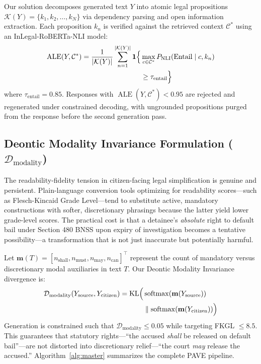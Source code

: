 \documentclass[conference]{IEEEtran}
\begin{document}
Our solution decomposes generated text $Y$ into atomic legal propositions $\mathcal{K}(Y) = \{k_1, k_2, \dots, k_N\}$ via dependency parsing and open information extraction. Each proposition $k_n$ is verified against the retrieved context $\mathcal{C}^*$ using an InLegal-RoBERTa-NLI model:
\begin{equation}
\begin{aligned}
\operatorname{ALE}(Y, \mathcal{C}^*) = \frac{1}{|\mathcal{K}(Y)|} \sum_{n=1}^{|\mathcal{K}(Y)|} \mathbf{1}\Bigl\{ &\max_{c \in \mathcal{C}^*} P_{\text{NLI}}(\text{Entail} \mid c, k_n) \\
&\ge \tau_{\text{entail}} \Bigr\}
\end{aligned}
\end{equation}
where $\tau_{\text{entail}} = 0.85$. Responses with $\operatorname{ALE}(Y, \mathcal{C}^*) < 0.95$ are rejected and regenerated under constrained decoding, with ungrounded propositions purged from the response before the second generation pass.

\subsection{Deontic Modality Invariance Formulation ($\mathcal{D}_{\text{modality}}$)}
The readability-fidelity tension in citizen-facing legal simplification is genuine and persistent. Plain-language conversion tools optimizing for readability scores---such as Flesch-Kincaid Grade Level---tend to substitute active, mandatory constructions with softer, discretionary phrasings because the latter yield lower grade-level scores. The practical cost is that a detainee's \textit{absolute} right to default bail under Section 480 BNSS upon expiry of investigation becomes a tentative possibility---a transformation that is not just inaccurate but potentially harmful.

Let $\mathbf{m}(T) = [n_{\text{shall}}, n_{\text{must}}, n_{\text{may}}, n_{\text{can}}]^\top$ represent the count of mandatory versus discretionary modal auxiliaries in text $T$. Our Deontic Modality Invariance divergence is:
\begin{equation}
\begin{aligned}
\mathcal{D}_{\text{modality}}(Y_{\text{source}}, Y_{\text{citizen}}) = \operatorname{KL}\Bigl( &\operatorname{softmax}(\mathbf{m}(Y_{\text{source}})) \\
&\parallel \operatorname{softmax}(\mathbf{m}(Y_{\text{citizen}})) \Bigr)
\end{aligned}
\end{equation}
Generation is constrained such that $\mathcal{D}_{\text{modality}} \le 0.05$ while targeting FKGL $\le 8.5$. This guarantees that statutory rights---``the accused \textit{shall} be released on default bail''---are not distorted into discretionary relief---``the court \textit{may} release the accused.'' Algorithm~\ref{alg:master} summarizes the complete PAVE pipeline.
\end{document}
